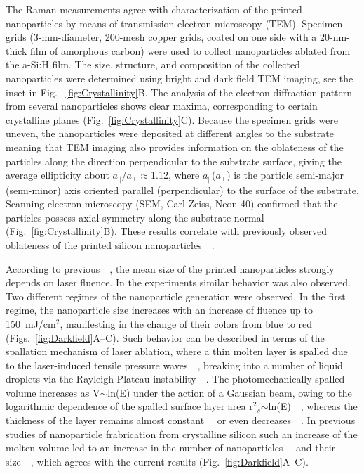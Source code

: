                 The Raman measurements agree with characterization of the printed nanoparticles by means of transmission electron
            microscopy (TEM). Specimen grids (3-mm-diameter, 200-mesh copper grids, coated on one side with a 20-nm-thick
            film of amorphous carbon) were used to collect nanoparticles ablated from the a-Si:H film. The size, structure, and composition
            of the collected nanoparticles were determined using bright and dark field TEM imaging, see the inset in Fig.
            ~\ref{fig:Crystallinity}B. The analysis of the electron diffraction pattern from several nanoparticles shows clear maxima,
            corresponding to certain crystalline planes (Fig.~\ref{fig:Crystallinity}C). Because the specimen grids were uneven, the
            nanoparticles were deposited at different angles to the substrate meaning that TEM imaging also provides information
            on the oblateness of the particles along the direction perpendicular to the substrate surface, giving the average
            ellipticity about $a_{\parallel}/a_{\perp}\approx$1.12, where $a_{\parallel}$($a_{\perp}$) is the particle semi-major
            (semi-minor) axis oriented parallel (perpendicular) to the surface of the substrate. Scanning electron
            microscopy (SEM, Carl Zeiss, Neon 40) confirmed that the particles possess axial symmetry along the substrate
            normal (Fig.~\ref{fig:Crystallinity}B). These results correlate with previously observed oblateness of the printed silicon
            nanoparticles~~\cite{zywietz2014laser}.

                According to previous~~\cite{zywietz2014laser, zywietz2014generation}, the mean size of the printed nanoparticles
            strongly depends on laser fluence. In the experiments similar behavior was also observed. Two different
            regimes of the nanoparticle generation were observed. In the first regime, the nanoparticle size increases
            with an increase of fluence up to 150~mJ/cm$^{2}$, manifesting in the change of their colors from blue to red
            (Figs.~\ref{fig:Darkfield}A--C). Such behavior can be described in terms of the spallation mechanism of laser ablation, where
            a thin molten layer is spalled due to the laser-induced tensile pressure waves~~\cite{ionin2013thermal,wu2014microscopic},
            breaking into a number of liquid droplets via the Rayleigh-Plateau instability~~\cite{papageorgiou1995breakup}.
            The photomechanically spalled volume increases as V$\sim$ln(E) under the action of a Gaussian beam, owing to the
            logarithmic dependence of the spalled surface layer area r$^{2}$$_{s}$$\sim$ln(E)~~\cite{bauerle2013laser}, whereas
            the thickness of the layer remains almost constant~~\cite{ionin2013thermal} or even decreases~~\cite{wu2014microscopic}.
            In previous studies of nanoparticle frabrication from crystalline silicon such an increase of the molten volume led
            to an increase in the number of nanoparticles~~\cite{zywietz2014generation} and their size~~\cite{zywietz2014laser},
            which agrees with the current results (Fig.~\ref{fig:Darkfield}A--C).

